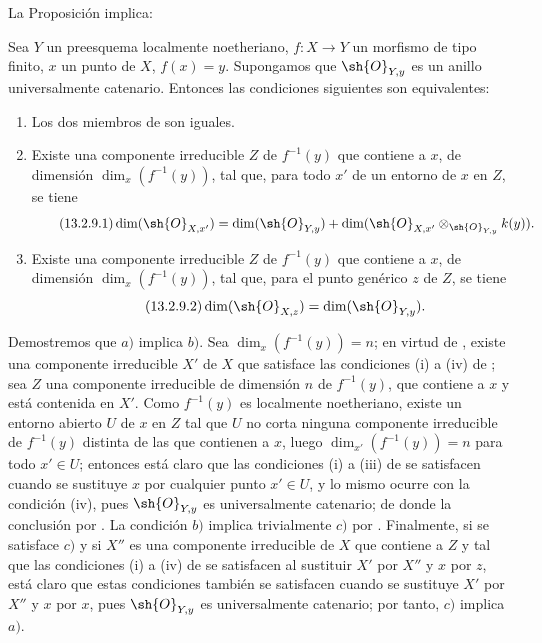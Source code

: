 La Proposición  implica:

\begin{corollary}[13.2.9]
\label{IV.13.2.9}
Sea $Y$ un preesquema localmente noetheriano, $f:X\to Y$ un morfismo de tipo finito, $x$ un punto de $X$, $f(x)=y$.
Supongamos que $\sh{O}_{Y,y}$ es un anillo universalmente catenario.
Entonces las condiciones siguientes son equivalentes:
\begin{enumerate}[label=\emph{\alph*)}]
  \item Los dos miembros de  son iguales.
  \item Existe una componente irreducible $Z$ de $f^{-1}(y)$ que contiene a $x$, de dimensión $\dim_x(f^{-1}(y))$, tal que, para todo $x'$ de un entorno de $x$ en $Z$, se tiene
  \[
  \label{IV.13.2.9.1}
\tag{13.2.9.1}
    \dim(\sh{O}_{X,x'})=\dim(\sh{O}_{Y,y})+\dim(\sh{O}_{X,x'}\otimes_{\sh{O}_{Y,y}}k(y)).
  \]
  \item Existe una componente irreducible $Z$ de $f^{-1}(y)$ que contiene a $x$, de dimensión $\dim_x(f^{-1}(y))$, tal que, para el punto genérico $z$ de $Z$, se tiene
  \[
  \label{IV.13.2.9.2}
\tag{13.2.9.2}
    \dim(\sh{O}_{X,z})=\dim(\sh{O}_{Y,y}).
  \]
\end{enumerate}
\end{corollary}

Demostremos que $a)$ implica $b)$.
Sea $\dim_x(f^{-1}(y))=n$; en virtud de , existe una componente irreducible $X'$ de $X$ que satisface las condiciones (i) a (iv) de ; sea $Z$ una componente irreducible de dimensión $n$ de $f^{-1}(y)$, que contiene a $x$ y está contenida en $X'$.
Como $f^{-1}(y)$ es localmente noetheriano, existe un entorno abierto $U$ de $x$ en $Z$ tal que $U$ no corta ninguna componente irreducible de $f^{-1}(y)$ distinta de las que contienen a $x$, luego  $\dim_{x'}(f^{-1}(y))=n$ para todo $x'\in U$; entonces está claro que las condiciones (i) a (iii) de  se satisfacen cuando se sustituye $x$ por cualquier punto $x'\in U$, y lo mismo ocurre con la condición (iv), pues $\sh{O}_{Y,y}$ es universalmente catenario; de donde la conclusión por .
La condición $b)$ implica trivialmente $c)$ por .
Finalmente, si se satisface $c)$ y si $X''$ es una componente irreducible de $X$ que contiene a $Z$ y tal que las condiciones (i) a (iv) de  se satisfacen al sustituir $X'$ por $X''$ y $x$ por $z$, está claro que estas condiciones también se satisfacen cuando se sustituye $X'$ por $X''$ y $x$ por $x$, pues $\sh{O}_{Y,y}$ es universalmente catenario; por tanto, $c)$ implica $a)$.

